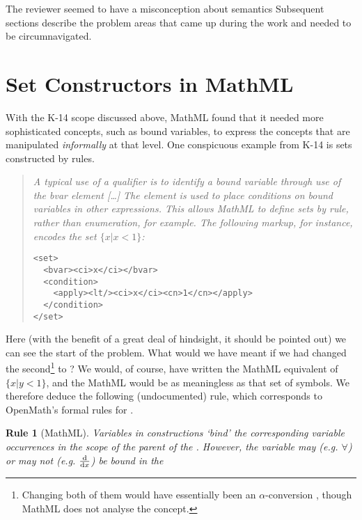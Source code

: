 \documentclass{llncs}
\newtheorem{Rule}{Rule}
\begin{document}
\begin{newpart}{The reviewer seemed to have a misconception about semantics}
Subsequent sections describe the problem areas that came up during the work and
needed to be circumnavigated.


\section{Set Constructors in MathML}\label{sec:setconstructors}

With the K-14 scope discussed above, MathML found that it needed more sophisticated
concepts, such as bound variables, to express the concepts that are manipulated
{\emph{informally}} at that level. One conspicuous example from K-14 is sets constructed
by rules.
\begin{quotation}\noindent\em 
  A typical use of a qualifier is to identify a bound variable through use of the bvar
  element [\ldots] The {} element is used to place conditions on bound
  variables in other expressions. This allows MathML to define sets by rule, rather than
  enumeration, for example. The following markup, for instance, encodes the set $\{x | x <
  1\}$:
\begin{lstlisting}[language=MathML2]
<set>
  <bvar><ci>x</ci></bvar>
  <condition>
    <apply><lt/><ci>x</ci><cn>1</cn></apply>
  </condition>
</set>
\end{lstlisting}
\strut\hfill{\hbox{\rm\cite[4.2.1.8]{WorldWideWebConsortium2003b}}}
\end{quotation}
\par\noindent
Here (with the benefit of a great deal of hindsight, it should be pointed out) we can see
the start of the problem. What would we have meant if we had changed the
second\footnote{Changing both of them would have essentially been an $\alpha$-conversion
  \cite[Definition 2.1.11]{Barendregt1984}, though MathML does not analyse the concept.}
{} to {}? We would, of course, have written the MathML equivalent of
$\{x | y < 1\}$, and the MathML would be as meaningless as that set of symbols.
We therefore deduce the following (undocumented) rule, which corresponds to
OpenMath's formal rules for {}.
\begin{Rule}[MathML]\label{rule:MML}
  Variables in {} constructions `bind' the corresponding variable occurrences in
  the scope of the parent of the {}. However, the variable may
(e.g. $\forall$) or may not (e.g. $\frac{\rm d}{{\rm d}x}$) be bound in the

\end{Rule}
\end{newpart}
\end{document}
